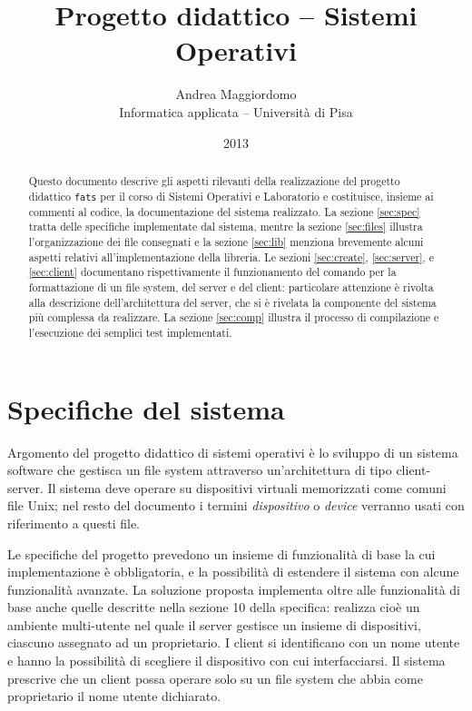 \documentclass[11pt,oneside,a4paper]{article}
\title{Progetto didattico -- Sistemi Operativi}
\author{Andrea Maggiordomo \\ Informatica applicata -- Università di Pisa}
\date{2013}
\begin{document}
\maketitle

\begin{abstract}
Questo documento descrive gli aspetti rilevanti della realizzazione del progetto didattico \texttt{fats} per il corso di Sistemi Operativi e Laboratorio e costituisce, insieme ai commenti al codice, la documentazione del sistema realizzato. La sezione \ref{sec:spec} tratta delle specifiche implementate dal sistema, mentre la sezione \ref{sec:files} illustra l'organizzazione dei file consegnati e la sezione \ref{sec:lib} menziona brevemente alcuni aspetti relativi all'implementazione della libreria. Le sezioni \ref{sec:create}, \ref{sec:server}, e \ref{sec:client} documentano rispettivamente il funzionamento del comando per la formattazione di un file system, del server e del client: particolare attenzione è rivolta alla descrizione dell'architettura del server, che si è rivelata la componente del sistema più complessa da realizzare. La sezione \ref{sec:comp} illustra il processo di compilazione e l'esecuzione dei semplici test implementati.
\end{abstract}

\section{Specifiche del sistema}
\label{sec:spec}
Argomento del progetto didattico di sistemi operativi è lo sviluppo di un sistema software che gestisca un file system attraverso un'architettura di tipo client-server. Il sistema deve operare su dispositivi virtuali memorizzati come comuni file Unix; nel resto del documento i termini \emph{dispositivo} o \emph{device} verranno usati con riferimento a questi file.

Le specifiche del progetto prevedono un insieme di funzionalità di base la cui implementazione è obbligatoria, e la possibilità di estendere il sistema con alcune funzionalità avanzate. La soluzione proposta implementa oltre alle funzionalità di base anche quelle descritte nella sezione 10 della specifica: realizza cioè un ambiente multi-utente nel quale il server gestisce un insieme di dispositivi, ciascuno assegnato ad un proprietario. I client si identificano con un nome utente e hanno la possibilità di scegliere il dispositivo con cui interfacciarsi. Il sistema prescrive che un client possa operare solo su un file system che abbia come proprietario il nome utente dichiarato.
\end{document}
